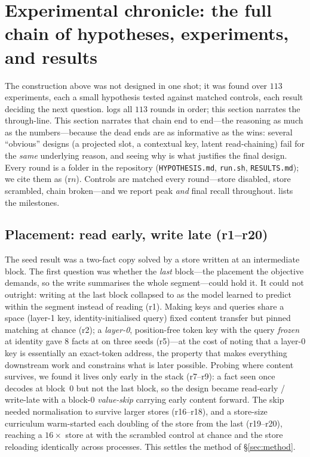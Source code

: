 \section{Experimental chronicle: the full chain of hypotheses, experiments, and results}
\label{sec:chronicle}

The construction above was not designed in one shot; it was found over
$113$ experiments, each a small hypothesis tested against matched controls, each
result deciding the next question.  logs all $113$ rounds in order;
this section narrates the through-line. This section narrates that chain end to end---the
reasoning as much as the numbers---because the dead ends are as informative as the
wins: several ``obvious'' designs (a projected slot, a contextual key, latent
read-chaining) fail for the \emph{same} underlying reason, and seeing why is what
justifies the final design. Every round is a folder in the repository
(\texttt{HYPOTHESIS.md}, \texttt{run.sh}, \texttt{RESULTS.md}); we cite them as
(r$n$). Controls are matched every round---store disabled, store scrambled, chain
broken---and we report peak \emph{and} final recall throughout. 
lists the milestones.

\subsection{Placement: read early, write late (r1--r20)}

The seed result was a two-fact copy solved by a store written at an intermediate block.
The first question was whether the \emph{last} block---the placement the objective
demands, so the write summarises the whole segment---could hold it. It could not
outright: writing at the last block collapsed to  as the model learned to
predict within the segment instead of reading (r1). Making keys and queries share a
space (layer-1 key, identity-initialised query) fixed content transfer but pinned
matching at chance (r2); a \emph{layer-0}, position-free token key with the query
\emph{frozen} at identity gave 8 facts at  on three seeds (r5)---at the
cost of noting that a layer-0 key is essentially an exact-token address, the property
that makes everything downstream work and constrains what is later possible. Probing
where content survives, we found it lives only early in the stack (r7--r9): a fact seen
once decodes at block~0 but not the last block, so the design became read-early /
write-late with a block-0 \emph{value-skip} carrying early content forward. The skip
needed normalisation to survive larger stores (r16--r18), and a store-size curriculum
warm-started each doubling of the store from the last (r19--r20), reaching a
$16\times$ store at  with the scrambled control at chance and the store
reloading identically across processes. This settles the method of \S\ref{sec:method}.

